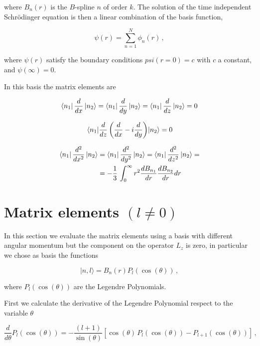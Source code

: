 \documentclass[12pt,a4paper]{article}
\newcommand{\dx}[1]{\frac{d{#1}}{dx}}
\newcommand{\dy}[1]{\frac{d{#1}}{dy}}
\newcommand{\dz}[1]{\frac{d{#1}}{dz}}
\newcommand{\ddx}[1]{\frac{d^2{#1}}{dx^2}}
\newcommand{\ddy}[1]{\frac{d^2{#1}}{dy^2}}
\newcommand{\ddz}[1]{\frac{d^2{#1}}{dz^2}}
\newcommand{\ct}{\cos(\theta)}
\newcommand{\st}{\sin(\theta)}
\begin{document}
\noindent where $B_n(r)$ is the $B$-spline $n$ of order $k$. The solution of the
time independent Schr\"odinger equation is then a linear combination of the basis
function,

\begin{equation}\label{eq:variational-sol}
\psi(r) = \sum_{n=1}^N \phi_n(r)\,,
\end{equation}

\noindent where $\psi(r)$ satisfy the boundary conditions $psi(r=0)= c$ with $c$
a constant, and $\psi(\infty) = 0$.

In this basis the matrix elements are

\begin{equation}
\bra{n_1}\dx{}\ket{n_2} = \bra{n_1}\dy{}\ket{n_2} = \bra{n_1}\dz{}\ket{n_2} = 0
\end{equation}

\begin{equation}
\mel{n_1}{\dz{}\left(\dx{} - i \dy{}\right)}{n_2} = 0
\end{equation}

\begin{equation}
\begin{split}
\bra{n_1}\ddx{}\ket{n_2} &= \bra{n_1}\ddy{}\ket{n_2} = \bra{n_1}\ddz{}\ket{n_2} =\\
                       &= -\frac{1}{3}\,\int_0^{\infty} r^2\frac{dB_{n_1}}{dr} \frac{dB_{n_2}}{dr} dr
\end{split}
\end{equation}

\section{Matrix elements $(l\neq 0)$}
In this section we evaluate the matrix elements using a basis with different angular
momentum but the component on the operator $L_z$ is zero, in particular we chose as basis the functions

\begin{equation}
|n,l\rangle = B_n(r) P_l(\ct)\,,
\end{equation}

\noindent where $P_l(\ct)$ are the Legendre Polynomials.

First we calculate the derivative of the Legendre Polynomial respect to the variable $\theta$

\begin{equation}
\frac{d}{d\theta}P_l(\ct) = -\frac{(l+1)}{\st} \left[\ct\,P_l(\ct) - P_{l+1}(\ct)\right]\,,
\end{equation}
\end{document}
